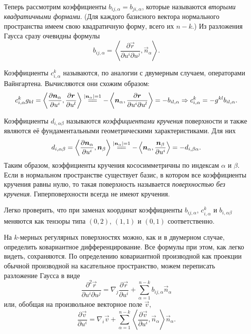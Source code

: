 Теперь рассмотрим коэффициенты $b_{ij, \alpha} = b_{ji, \alpha}$, которые называются \textit{вторыми квадратичными формами}. (Для каждого базисного вектора нормального пространства имеем свою квадратичную форму, всего их $n - k$.) Из разложения Гаусса сразу очевидны формулы
\[
	b_{ij, \alpha} = \left\langle\frac{\partial\vec{r}}{\partial u^i \partial u^j}, \vec{n}_{\alpha}\right\rangle.
\]

Коэффициенты $c_{i, \alpha}^k$ называются, по аналогии с двумерным случаем, операторами Вайнгартена. Вычисляются они схожим образом:
\[
	c_{i, \alpha}^kg_{kl} = \left\langle\frac{\partial\vec{n}_\alpha}{\partial u^i}, \frac{\partial\vec{r}}{\partial u^l}\right\rangle \stackrel{\abs{\vec{n}_\alpha} = 1}{=\joinrel=} -\left\langle\vec{n}_\alpha, \frac{\partial\vec{r}}{\partial u^i \partial u^l}\right\rangle = -b_{il, \alpha} \Rightarrow c_{i, \alpha}^k = -g^{kl}b_{il, \alpha}.
\]

Коэффициенты $d_{i, \alpha\beta}$ называются \textit{коэффициентами кручения} поверхности и также являются её фундаментальными геометрическими характеристиками. Для них
\[
	d_{i, \alpha\beta} = \left\langle\frac{\partial\vec{n}_\alpha}{\partial u^i}, \vec{n}_\beta\right\rangle \stackrel{\abs{\vec{n}_\alpha} = 1}{=\joinrel=} -\left\langle \vec{n}_\alpha, \frac{\vec{n}_\beta}{\partial u^i}\right\rangle = -d_{i, \beta\alpha}.
\]
Таким образом, коэффициенты кручения кососимметричны по индексам $\alpha$ и $\beta$. Если в нормальном пространстве существует базис, в котором все коэффициенты кручения равны нулю, то такая поверхность называется \textit{поверхностью без кручения}. Гиперповерхности всегда не имеют кручения.

Легко проверить, что при заменах координат коэффициенты $b_{ij, \alpha}$, $c_{i, \alpha}^k$ и $b_{i, \alpha\beta}$ меняются как тензоры типа $(0, 2)$, $(1, 1)$ и $(0, 1)$ соответственно.

На $k$-мерных регулярных поверхностях можно, как и в двумерном случае, определить ковариантное дифференцирование. Все формулы при этом, как легко видеть, сохраняются. По определению ковариантной производной как проекции обычной производной на касательное пространство, можем переписать разложение Гаусса в виде
\[
	\frac{\partial^2\vec{r}}{\partial u^i\partial u^j} = \nabla_j\frac{\partial\vec{r}}{\partial u^i} + \sum_{\alpha = 1}^{n - k}b_{ij, \alpha}\vec{n}_\alpha
\]
или, обобщая на произвольное векторное поле $\vec{v}$,
\begin{equation} \label{eq:Covariantkdim}
	\frac{\partial\vec{v}}{\partial u^i} = \nabla_i\vec{v} + \sum_{\alpha = 1}^{n - k}\left\langle\frac{\partial\vec{v}}{\partial u^i}, \vec{n}_\alpha\right\rangle\vec{n}_\alpha.
\end{equation}

